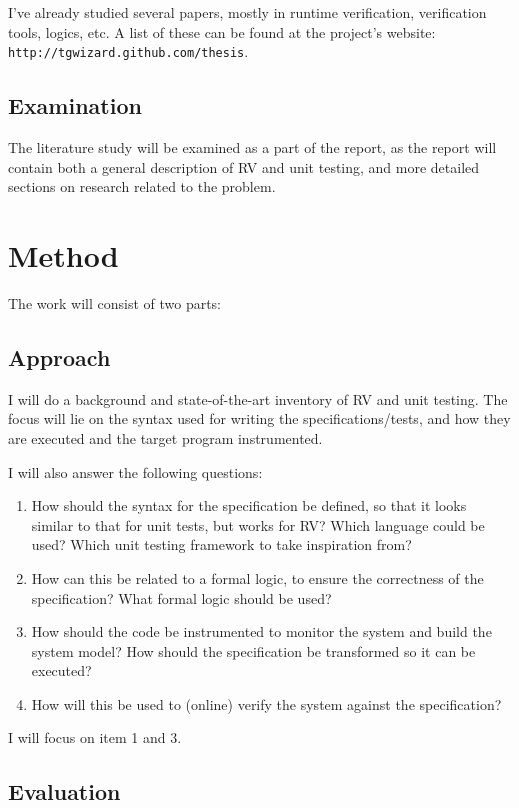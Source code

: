 \documentclass[a4paper,11pt]{article}
\begin{document}
I've already studied several papers, mostly in runtime verification, verification tools, logics, etc.
A list of these can be found at the project's website: \texttt{http://tgwizard.github.com/thesis}.

\subsection{Examination}

The literature study will be examined as a part of the report, as the report will contain
both a general description of RV and unit testing, and more detailed sections on research related to the problem.


\section{Method}

The work will consist of two parts:


\subsection{Approach}

I will do a background and state-of-the-art inventory of RV and unit testing. The focus will lie on the syntax used for writing the specifications/tests, and how they are executed and the target program instrumented.

I will also answer the following questions:

\begin{enumerate}
	\item How should the syntax for the specification be defined,
		so that it looks similar to that for unit tests, but works for RV?
		Which language could be used? Which unit testing framework to take inspiration from?
	\item How can this be related to a formal logic, to ensure the correctness of the specification?
		What formal logic should be used? 
	\item How should the code be instrumented to monitor the system and build the system model?
		How should the specification be transformed so it can be executed? 
	\item How will this be used to (online) verify the system against the specification?
\end{enumerate}

I will focus on item 1 and 3.


\subsection{Evaluation}
\end{document}
